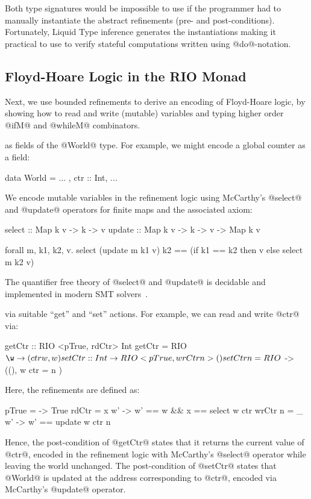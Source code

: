 Both type signatures would be impossible 
to use if the programmer had to manually 
instantiate the abstract refinements 
(\ie pre- and post-conditions).
%
Fortunately, Liquid Type inference %
generates the instantiations making it practical
to use \toolname to verify stateful computations
written using @do@-notation.

\subsection{Floyd-Hoare Logic in the RIO Monad}
\label{subsec:state:examples}

Next, we use bounded refinements to derive an
encoding of Floyd-Hoare logic, by showing how to 
read and write (mutable) variables and
typing higher order 
@ifM@ and @whileM@ combinators.

 as fields of 
the @World@ type. For example, we might encode
a global counter as a field:
%
\begin{code}
  data World = { ... , ctr :: Int, ... }
\end{code}
%
We encode mutable variables in the refinement logic
using McCarthy's @select@ and @update@ operators 
for finite maps and the associated axiom:
%
\begin{code}
  select :: Map k v -> k -> v
  update :: Map k v -> k -> v -> Map k v

  forall m, k1, k2, v.
       select (update m k1 v) k2
    == (if k1 == k2 then v else select m k2 v)
\end{code}
%
The quantifier free theory of @select@ and @update@ is decidable
and implemented in modern SMT solvers~\cite{SMTLIB2}.

 via 
suitable ``get'' and ``set'' actions. For example,
we can read and write @ctr@ via:
%
\begin{code}
  getCtr   :: RIO <pTrue, rdCtr> Int
  getCtr   = RIO $ \w -> (ctr w, w)
    
  setCtr   :: Int -> RIO <pTrue, wrCtr n> ()
  setCtr n = RIO $ \w -> ((), w { ctr = n })
\end{code}
Here, the refinements are defined as:
%
\begin{code}
  pTrue = \w -> True
  rdCtr = \w x w' -> w' == w && x == select w ctr
  wrCtr n = \w _ w' -> w' == update w ctr n 
\end{code}
%
Hence, the post-condition of @getCtr@ states 
that it returns the current value of @ctr@, 
encoded in the refinement logic with McCarthy's 
@select@ operator while leaving the world unchanged.
%
The post-condition of @setCtr@ states that @World@
is updated at the address corresponding to @ctr@,
encoded via McCarthy's @update@ operator. 

